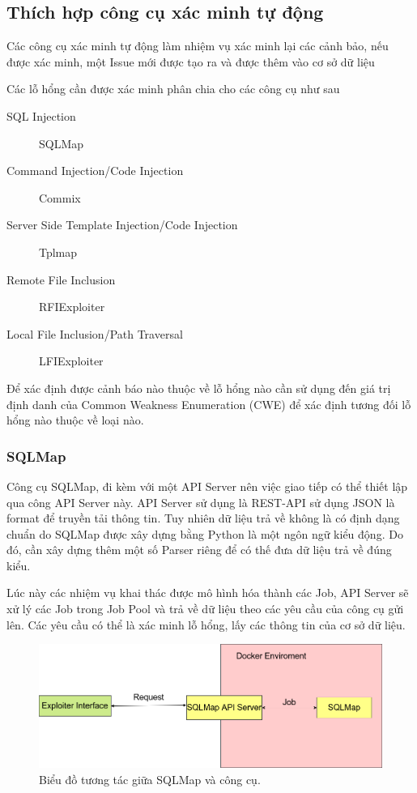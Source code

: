 \documentclass[./../main.tex]{subfiles}
\begin{document}
\subsection{Thích hợp công cụ xác minh tự động}
Các công cụ xác minh tự động làm nhiệm vụ xác minh lại các cảnh bảo,
nếu được xác minh, một Issue mới được tạo ra và được thêm vào cơ sở dữ
liệu

Các lỗ hổng cần được xác minh phân chia cho các công cụ như sau
\begin{description}
	\item[SQL Injection] SQLMap
	\item [Command Injection/Code Injection] Commix
	\item [Server Side Template Injection/Code Injection] Tplmap
	\item [Remote File Inclusion] RFIExploiter
	\item [Local File Inclusion/Path Traversal] LFIExploiter
\end{description}
Để xác định được cảnh báo nào thuộc về lỗ hổng nào cần sử dụng đến
giá trị định danh của Common Weakness Enumeration (CWE) để xác định
tương đối lỗ hổng nào thuộc về loại nào.
\subsubsection{SQLMap}
Công cụ SQLMap, đi kèm với một API Server nên việc giao tiếp có thể thiết
lập qua công API Server này. API Server sử dụng là REST-API sử dụng JSON
là format để truyền tải thông tin. Tuy nhiên dữ liệu trả về không là có
định dạng chuẩn do SQLMap được xây dựng bằng Python là một ngôn ngữ kiểu
động. Do đó, cần xây dựng thêm một số Parser riêng để có thế đưa dữ liệu
trả về đúng kiểu.

Lúc này các nhiệm vụ khai thác được mô hình hóa thành các Job, API Server
sẽ xử lý các Job trong Job Pool và trả về dữ liệu theo các yêu cầu của công
cụ gửi lên. Các yêu cầu có thể là xác minh lỗ hổng, lấy các thông tin của
cơ sở dữ liệu.


\begin{figure}[H]
	\includegraphics[width=\linewidth]{./images/SQLMap.png}
	\caption{Biểu đồ tương tác giữa SQLMap và công cụ.}
	\label{fig:sqlmap}
\end{figure}
\end{document}
